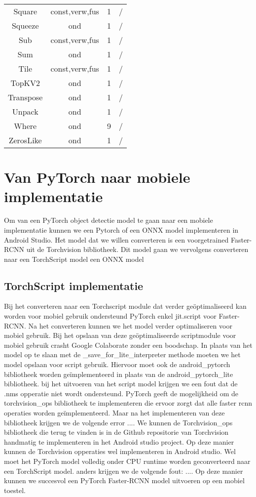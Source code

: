 \begin{table}[!ht]
\begin{tabular}{cccc}
    Square & const,verw,fus & 1 & / \\
    Squeeze & ond & 1 & / \\
    Sub & const,verw,fus & 1 & / \\
    Sum & ond & 1 & / \\
    Tile & const,verw,fus & 1 & / \\
    TopKV2 & ond & 1 & / \\
    Transpose & ond & 1 & / \\
    Unpack & ond & 1 & / \\
    Where & ond & 9 & / \\
    ZerosLike & ond & 1 & / \\
    \hline
\end{tabular}
\label{tab:TFop}
\end{table}

\section{Van PyTorch naar mobiele implementatie}
Om van een PyTorch object detectie model te gaan naar een mobiele implementatie kunnen we een Pytorch of een ONNX model implementeren in Android Studio.
Het model dat we willen converteren is een voorgetrained Faster-RCNN uit de Torchvision bibliotheek.
Dit model gaan we vervolgens converteren naar een TorchScript model een ONNX model

\subsection{TorchScript implementatie}

Bij het converteren naar een Torchscript module dat verder ge\"optimaliseerd kan worden voor mobiel gebruik ondersteund PyTorch enkel jit.script voor Faster-RCNN.
Na het converteren kunnen we het model verder optimaliseren voor mobiel gebruik.
Bij het opslaan van deze ge\"optimaliseerde scriptmodule voor mobiel gebruik crasht Google Colaborate zonder een boodschap.
In plaats van het model op te slaan met de \_save\_for\_lite\_interpreter methode moeten we het model opslaan voor script gebruik.
Hiervoor moet ook de android\_pytorch bibliotheek worden ge\"implementeerd in plaats van de android\_pytorch\_lite bibliotheek.
bij het uitvoeren van het script model krijgen we een fout dat de .nms opperatie niet wordt ondersteund.
PyTorch geeft de mogelijkheid om de torchvision\_ops bibliotheek te implementeren die ervoor zorgt dat alle faster rcnn operaties worden ge\"implementeerd.
Maar na het implementeren van deze bibliotheek krijgen we de volgende error ....
We kunnen de Torchvision\_ops bibliotheek die terug te vinden is in de Github repositorie van Torchvision handmatig te implementeren in het Android studio project.
Op deze manier kunnen de Torchvision opperaties wel implementeren in Android studio.
Wel moet het PyTorch model volledig onder CPU runtime worden geconverteerd naar een TorchScript model.
anders krijgen we de volgende fout: .... %
Op deze manier kunnen we succesvol een PyTorch Faster-RCNN model uitvoeren op een mobiel toestel.

